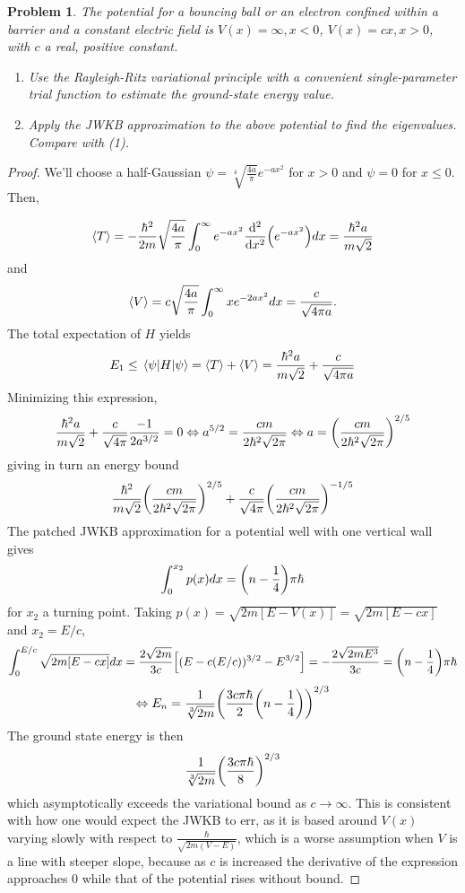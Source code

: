 \documentclass{article}
\newtheorem{plm}{Problem}
\begin{document}
\begin{plm}
  The potential for a bouncing ball or an electron confined within a barrier and a constant electric field is $V(x) = \infty, x < 0$,
  $V(x) = cx, x > 0$, with $c$ a real, positive constant.
  \begin{enumerate}
  \item Use the Rayleigh-Ritz variational principle with a convenient single-parameter trial function to estimate the ground-state energy value.
  \item Apply the JWKB approximation to the above potential to find the eigenvalues.
    Compare with (1).
  \end{enumerate}
\end{plm}

\begin{proof}
  We'll choose a half-Gaussian $\psi = \sqrt[4]{\frac{4a}{\pi}}e^{-ax^{2}}$ for $x > 0$ and $\psi = 0$ for $x \leq 0$.
  Then,

  \[
    \expval{T} = -\frac{\hbar^{2}}{2m}\sqrt{\frac{4a}{\pi}}\int_{0}^{\infty}e^{-ax^{2}}\dv[2]{x}\qty(e^{-ax^{2}})dx =\frac{\hbar^{2}a}{m\sqrt{2}}
  \]
  and
  \[
    \expval{V} = c\sqrt{\frac{4a}{\pi}}\int_{0}^{\infty}xe^{-2ax^{2}}dx = \frac{c}{\sqrt{4\pi a}}.
  \]
  The total expectation of $H$ yields
  \[
    E_{1} \leq \expval{H}{\psi} = \expval{T} + \expval{V} = \frac{\hbar^{2}a}{m\sqrt{2}} + \frac{c}{\sqrt{4\pi a}}
  \]
  Minimizing this expression,
  \[
    \frac{\hbar^{2}a}{m\sqrt{2}} + \frac{c}{\sqrt{4\pi}}\frac{-1}{2a^{3/2}} = 0
    \Leftrightarrow a^{5/2} = \frac{cm}{2\hbar^{2}\sqrt{2\pi}}
    \Leftrightarrow a = \qty(\frac{cm}{2\hbar^{2}\sqrt{2\pi}})^{2/5}
  \]
  giving in turn an energy bound
  \[
    \frac{\hbar^{2}}{m\sqrt{2}}\qty(\frac{cm}{2\hbar^{2}\sqrt{2\pi}})^{2/5} + \frac{c}{\sqrt{4\pi}}\qty(\frac{cm}{2\hbar^{2}\sqrt{2\pi}})^{-1/5}
  \]
  The patched JWKB approximation for a potential well with one vertical wall gives
  \[
    \int_{0}^{x_{2}}p(x)dx = \qty(n - \frac{1}{4})\pi\hbar
  \]
  for $x_{2}$ a turning point.
  Taking $p(x) = \sqrt{2m[E - V(x)]} = \sqrt{2m[E - cx]}$ and $x_{2} = E/c$,
  \[
    \int_{0}^{E/c}\sqrt{2m[E - cx]}dx = \frac{2\sqrt{2m}}{3c}\qty[(E - c(E/c))^{3/2} - E^{3/2}] = -\frac{2\sqrt{2mE^{3}}}{3c}
    = \qty(n - \frac{1}{4})\pi\hbar
  \]
  \[
    \Leftrightarrow E_{n} = \frac{1}{\sqrt[3]{2m}}\qty(\frac{3c\pi\hbar}{2}\qty(n - \frac{1}{4}))^{2/3}
  \]
  The ground state energy is then
  \[
    \frac{1}{\sqrt[3]{2m}}\qty(\frac{3c\pi\hbar}{8})^{2/3}
  \]
  which asymptotically exceeds the variational bound as $c \to \infty$.
  This is consistent with how one would expect the JWKB to err, as it is based around $V(x)$ varying slowly with respect to
  $\frac{\hbar}{\sqrt{2m(V - E)}}$, which is a worse assumption when $V$ is a line with steeper slope,
  because as $c$ is increased the derivative of the expression approaches 0 while that of the potential rises without bound.
\end{proof}
\end{document}
